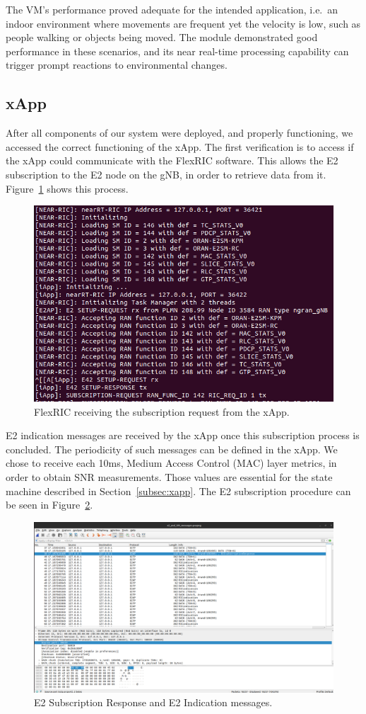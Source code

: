 The VM's performance proved adequate for the intended application, i.e.\ an indoor environment where movements are frequent yet the velocity is low, such as people walking or objects being moved.
The module demonstrated good performance in these scenarios, and its near real-time processing capability can trigger prompt reactions to environmental changes.

\subsection{xApp}\label{subsec:mm_xapp}
After all components of our system were deployed, and properly functioning, we accessed the correct functioning of the xApp.
The first verification is to access if the xApp could communicate with the FlexRIC software.
This allows the E2 subscription to the E2 node on the gNB, in order to retrieve data from it.
Figure~\ref{fig:xapp_subscription} shows this process.

\begin{figure}[H]
    \centering
    \includegraphics[width=0.5\linewidth]{figures/xapp_subscription}
    \caption{FlexRIC receiving the subscription request from the xApp.}
    \label{fig:xapp_subscription}
\end{figure}

E2 indication messages are received by the xApp once this subscription process is concluded.
The periodicity of such messages can be defined in the xApp.
We chose to receive each 10ms, Medium Access Control (MAC) layer metrics, in order to obtain SNR measurements.
Those values are essential for the state machine described in Section~\ref{subsec:xapp}.
The E2 subscription procedure can be seen in Figure~\ref{fig:captura_e2ap}.

\begin{figure}[H]
    \centering
    \includegraphics[width=0.5\linewidth]{figures/ric_subs}
    \caption{E2 Subscription Response and E2 Indication messages.}
    \label{fig:captura_e2ap}
\end{figure}

